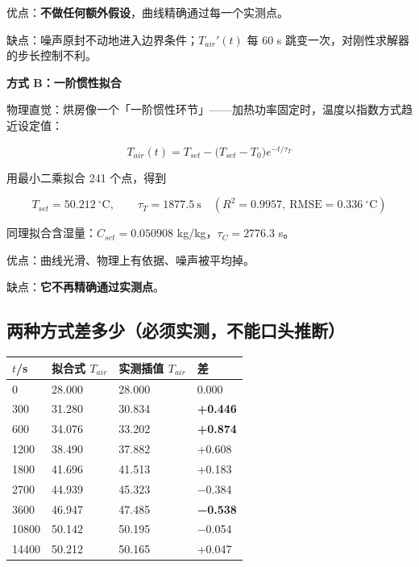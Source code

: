 优点：\textbf{不做任何额外假设}，曲线精确通过每一个实测点。

缺点：噪声原封不动地进入边界条件；$T_{air}'(t)$ 每 60 s 跳变一次，对刚性求解器的步长控制不利。


\textbf{方式 B：一阶惯性拟合}


物理直觉：烘房像一个「一阶惯性环节」——加热功率固定时，温度以指数方式趋近设定值：


\begin{equation}
T_{air}(t)=T_{set}-\big(T_{set}-T_0\big)e^{-t/\tau_T}\tag{9.1}
\end{equation}


用最小二乘拟合 241 个点，得到


\begin{equation*}
T_{set}=50.212\ \mathrm{^\circ C},\qquad \tau_T=1877.5\ \mathrm{s}\quad(R^2=0.9957,\ \mathrm{RMSE}=0.336\ \mathrm{^\circ C})
\end{equation*}


同理拟合含湿量：$C_{set}=0.050908$ kg/kg，$\tau_C=2776.3$ s。


优点：曲线光滑、物理上有依据、噪声被平均掉。

缺点：\textbf{它不再精确通过实测点}。


\subsection{两种方式差多少（必须实测，不能口头推断）}


\begin{center}
\small
\begin{tabular}{llll}
\toprule
$t$/s & 拟合式 $T_{air}$ & 实测插值 $T_{air}$ & 差 \\
\midrule
0 & 28.000 & 28.000 & 0.000 \\
300 & 31.280 & 30.834 & \textbf{+0.446} \\
600 & 34.076 & 33.202 & \textbf{+0.874} \\
1200 & 38.490 & 37.882 & +0.608 \\
1800 & 41.696 & 41.513 & +0.183 \\
2700 & 44.939 & 45.323 & −0.384 \\
3600 & 46.947 & 47.485 & \textbf{−0.538} \\
10800 & 50.142 & 50.195 & −0.054 \\
14400 & 50.212 & 50.165 & +0.047 \\
\bottomrule
\end{tabular}
\end{center}


